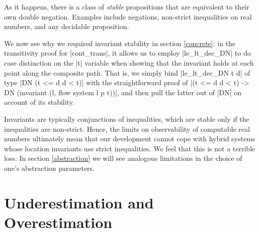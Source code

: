 \documentclass[runningheads]{llncs}
\begin{document}
As it happens, there is a class of \emph{stable} propositions that are equivalent to their own double negation. Examples include negations, non-strict inequalities on real numbers, and any decidable proposition.

We now see why we required invariant stability in section \ref{concrete}: in the transitivity proof for |cont_trans|, it allows us to employ |le_lt_dec_DN| to do case distinction on the |t| variable when showing that the invariant holds at each point along the composite path. That is, we simply bind |le_lt_dec_DN t d| of type |DN (t <= d \/ d < t)| with the straightforward proof of |(t <= d \/ d < t) -> DN (invariant (l, flow system l p t))|, and then pull the latter out of |DN| on account of its stability.

Invariants are typically conjunctions of inequalities, which are stable only if the inequalities are non-strict. Hence, the limits on observability of computable real numbers ultimately mean that our development cannot cope with hybrid systems whose location invariants use strict inequalities. We feel that this is not a terrible loss. In section \ref{abstraction} we will see analogous limitations in the choice of one's abstraction parameters.



\section{Underestimation and Overestimation}
\label{estimation}
\end{document}
